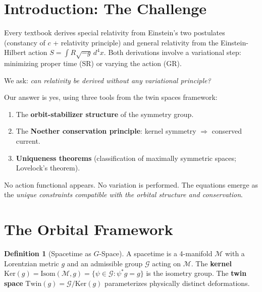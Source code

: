 \documentclass[11pt,twocolumn]{article}
\theoremstyle{plain}\newtheorem{theorem}{Theorem}\newtheorem{proposition}[theorem]{Proposition}\newtheorem{corollary}[theorem]{Corollary}\newtheorem{lemma}[theorem]{Lemma}
\theoremstyle{definition}\newtheorem{definition}[theorem]{Definition}
\theoremstyle{remark}\newtheorem{remark}[theorem]{Remark}
\newcommand{\Ker}{\mathrm{Ker}}
\newcommand{\Isom}{\mathrm{Isom}}
\newcommand{\Twin}{\mathrm{Twin}}
\begin{document}
\section{Introduction: The Challenge}

Every textbook derives special relativity from Einstein's two postulates (constancy of $c$ + relativity principle) and general relativity from the Einstein-Hilbert action $S = \int R\sqrt{-g}\,d^4x$. Both derivations involve a variational step: minimizing proper time (SR) or varying the action (GR).

We ask: \emph{can relativity be derived without any variational principle?}

Our answer is yes, using three tools from the twin spaces framework:
\begin{enumerate}
    \item The \textbf{orbit-stabilizer structure} of the symmetry group.
    \item The \textbf{Noether conservation principle}: kernel symmetry $\Rightarrow$ conserved current.
    \item \textbf{Uniqueness theorems} (classification of maximally symmetric spaces; Lovelock's theorem).
\end{enumerate}

No action functional appears. No variation is performed. The equations emerge as the \emph{unique constraints compatible with the orbital structure and conservation}.


\section{The Orbital Framework}
\label{sec:orbital}

\begin{definition}[Spacetime as $G$-Space]\label{def:gspace}
A spacetime is a 4-manifold $\mathcal{M}$ with a Lorentzian metric $g$ and an admissible group $\mathcal{G}$ acting on $\mathcal{M}$. The \textbf{kernel} $\Ker(g) = \Isom(\mathcal{M}, g) = \{\psi \in \mathcal{G} : \psi^*g = g\}$ is the isometry group. The \textbf{twin space} $\Twin(g) = \mathcal{G}/\Ker(g)$ parameterizes physically distinct deformations.
\end{definition}
\end{document}
